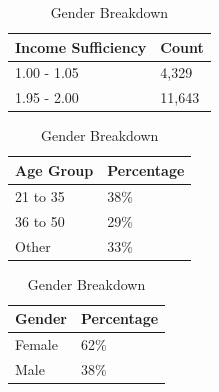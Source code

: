 \documentclass[runningheads]{llncs}
\begin{document}
\begin{enumerate}
\begin{table}[ht]
    \begin{minipage}{0.45\linewidth}
        \centering
        \caption{Income Sufficiency}\label{tab:income_sufficiency}
        \begin{tabular}{|l|l|}
            \hline
            \textbf{Income Sufficiency} & \textbf{Count} \\ 
            \hline
            1.00 - 1.05 & 4,329 \\ 
            1.95 - 2.00 & 11,643 \\ 
            \hline
        \end{tabular}
    \end{minipage}
    \hspace{0.05\linewidth} %
    \begin{minipage}{0.45\linewidth}
        \centering
        \caption{Demographic Breakdown}\label{tab:demographic_breakdown}
        \begin{tabular}{|l|l|}
            \hline
            \textbf{Age Group} & \textbf{Percentage} \\ 
            \hline
            21 to 35 & 38\% \\ 
            36 to 50 & 29\% \\ 
            Other & 33\% \\ 
            \hline
        \end{tabular}
    \end{minipage}
    \hspace{0.05\linewidth} %
    \begin{minipage}{0.45\linewidth}
        \centering
        \caption{Gender Breakdown}\label{tab:gender_breakdown}
        \begin{tabular}{|l|l|}
            \hline
            \textbf{Gender} & \textbf{Percentage} \\ 
            \hline
            Female & 62\% \\ 
            Male & 38\% \\ 
            \hline
        \end{tabular}
    \end{minipage}
\end{table}


\end{enumerate}
\end{document}
